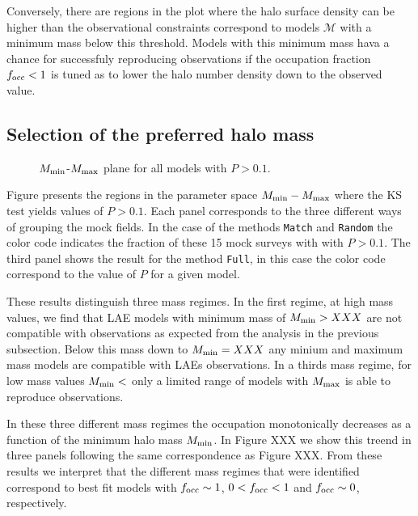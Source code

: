 \documentclass{emulateapj}
\begin{document}
Conversely, there are regions in the plot where the halo surface
density can be higher than the observational constraints correspond to
models ${\mathcal M}$ with a minimum mass below this threshold. Models
with this minimum mass hava a chance for successfuly reproducing
observations if the occupation fraction $f_{\rm occ}<1$ is tuned as to
lower the halo number density down to the observed value.   

\subsection{Selection of the preferred halo mass}

\begin{figure}
\begin{center}
\end{center} 
\caption{$M_{\rm min}$-$M_{\rm max}$ plane for all models with
  $P>0.1$\label{figure:landscape}.} 
\end{figure}

Figure \label{figure:landscape} presents the regions in the parameter
space $M_{\rm min}-M_{\rm max}$ where the KS test yields values of
$P>0.1$. Each panel corresponds to the three different ways of
grouping the mock fields. In the case of the methods {\tt{Match}}
and {\tt{Random}} the color code indicates the fraction of these 15
mock surveys with with $P>0.1$. The third panel shows the result for
the method {\tt{Full}}, in this case the color code correspond
to the value of $P$ for a given model.  

These results distinguish three mass regimes. In the first regime, at
high mass values, we find that LAE models with minimum mass of $M_{\rm
  min}>XXX$ are not compatible with observations as expected from the
analysis in the previous subsection. Below this mass down to $M_{\rm
  min}=XXX$ any minium and maximum mass models are compatible with
LAEs observations. In a thirds mass regime, for low mass values
$M_{\rm min}<$ only a limited range of models with $M_{\rm max}$ is
able to reproduce observations. 

In these three different mass regimes the occupation monotonically
decreases as a function of the minimum halo mass $M_{\rm min}$. In
Figure XXX we show this treend in three panels following the same
correspondence as Figure XXX. From these results we interpret that the
different mass regimes that were identified correspond to best fit
models with $f_{\rm occ}\sim 1$, $0<f_{\rm occ}<1$ and $f_{\rm
  occ}\sim 0$, respectively. 
\end{document}
